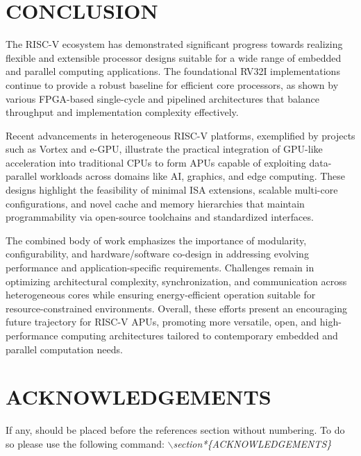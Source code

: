 \documentclass[a4paper,twoside]{article}
\begin{document}
\section{\uppercase{Conclusion}}
The RISC-V ecosystem has demonstrated significant progress towards realizing flexible and extensible processor designs suitable for a wide range of embedded and parallel computing applications. The foundational RV32I implementations continue to provide a robust baseline for efficient core processors, as shown by various FPGA-based single-cycle and pipelined architectures that balance throughput and implementation complexity effectively.

Recent advancements in heterogeneous RISC-V platforms, exemplified by projects such as Vortex and e-GPU, illustrate the practical integration of GPU-like acceleration into traditional CPUs to form APUs capable of exploiting data-parallel workloads across domains like AI, graphics, and edge computing. These designs highlight the feasibility of minimal ISA extensions, scalable multi-core configurations, and novel cache and memory hierarchies that maintain programmability via open-source toolchains and standardized interfaces.

The combined body of work emphasizes the importance of modularity, configurability, and hardware/software co-design in addressing evolving performance and application-specific requirements. Challenges remain in optimizing architectural complexity, synchronization, and communication across heterogeneous cores while ensuring energy-efficient operation suitable for resource-constrained environments. Overall, these efforts present an encouraging future trajectory for RISC-V APUs, promoting more versatile, open, and high-performance computing architectures tailored to contemporary embedded and parallel computation needs.

\section*{\uppercase{Acknowledgements}}

If any, should be placed before the references section
without numbering. To do so please use the following command:
\textit{$\backslash$section*\{ACKNOWLEDGEMENTS\}}
\end{document}
